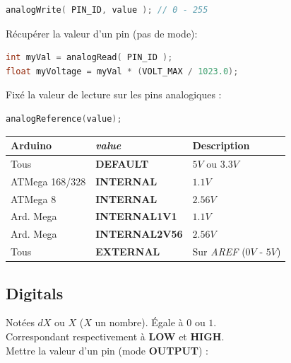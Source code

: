             \begin{lstlisting}[language=C]
analogWrite( PIN_ID, value ); // 0 - 255
            \end{lstlisting}
            \vspace{0.5cm}
            Récupérer la valeur d'un pin (pas de mode):

            \begin{lstlisting}[language=C]
int myVal = analogRead( PIN_ID );
float myVoltage = myVal * (VOLT_MAX / 1023.0);
            \end{lstlisting}

            Fixé la valeur de lecture sur les pins analogiques :

            \begin{lstlisting}[language=C]
analogReference(value);
            \end{lstlisting}
            \begin{center}
                \begin{tabular}{| l | l | l |}
                    \hline
                        Arduino & \textit{value} & Description \\
                    \hline
                        Tous & \textbf{DEFAULT} & $5V$ ou $3.3V$ \\
                        ATMega 168/328 & \textbf{INTERNAL} & $1.1V$ \\
                        ATMega 8 & \textbf{INTERNAL} & $2.56V$ \\
                        Ard. Mega & \textbf{INTERNAL1V1} & $1.1V$ \\
                        Ard. Mega & \textbf{INTERNAL2V56} & $2.56V$ \\
                        Tous & \textbf{EXTERNAL} & Sur \textit{AREF} ($0V$ - $5V$) \\
                    \hline
                \end{tabular}
            \end{center}

        \subsection{Digitals}

            Notées $dX$ ou $X$ ($X$ un nombre). Égale à $0$ ou $1$.\\
            Correspondant respectivement à \textbf{LOW} et \textbf{HIGH}.\\

            Mettre la valeur d'un pin (mode \textbf{OUTPUT}) :

